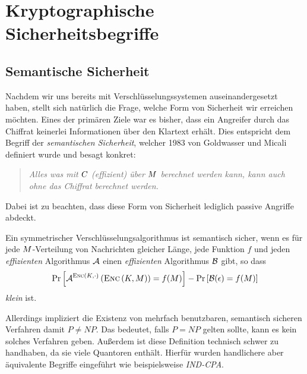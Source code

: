 \chapter{Kryptographische Sicherheitsbegriffe}
\section{Semantische Sicherheit}\label{ch:sicherheitsbegriffe:semantischesicherheit}
Nachdem wir uns bereits mit Verschlüsselungssystemen auseinandergesetzt haben, stellt sich natürlich die Frage, welche Form von Sicherheit wir erreichen möchten. 
Eines der primären Ziele war es bisher, dass ein Angreifer durch das Chiffrat keinerlei Informationen über den Klartext erhält. Dies entspricht dem Begriff der \emph{semantischen Sicherheit},
welcher 1983 von Goldwasser und Micali \cite{Goldwasser1984} definiert wurde und besagt konkret:
\begin{quote}
	\emph{Alles was mit $C$ (effizient) über $M$ berechnet werden kann, kann auch ohne das Chiffrat berechnet werden.}
\end{quote}
Dabei ist zu beachten, dass diese Form von Sicherheit lediglich passive Angriffe abdeckt.

\begin{definition}\label{def:semsec}
Ein symmetrischer Verschlüsselungsalgorithmus ist semantisch sicher, wenn es für jede $M$-Verteilung von Nachrichten gleicher Länge, jede Funktion $f$
und jeden \emph{effizienten} Algorithmus $\mathcal{A}$ einen \emph{effizienten} Algorithmus $\mathcal{B}$ gibt, so dass
\begin{align*}
	\text{Pr}\left[ \mathcal{A}^{\textsc{Enc} (K,\cdot)} \left( \textsc{Enc} \left( K, M \right) \right) = f(M) \right] - \text{Pr} \left[ \mathcal{B} (\epsilon) = f (M) \right]
\end{align*}
\emph{klein} ist.
\end{definition}

Allerdings impliziert die Existenz von mehrfach benutzbaren, semantisch sicheren Verfahren damit $P \neq NP$. Das bedeutet, falls $P = NP$ gelten sollte, kann
es kein solches Verfahren geben. Außerdem ist diese Definition technisch schwer zu handhaben, da sie viele Quantoren enthält. Hierfür wurden handlichere
aber äquivalente Begriffe eingeführt wie beispielsweise \emph{IND-CPA}.

